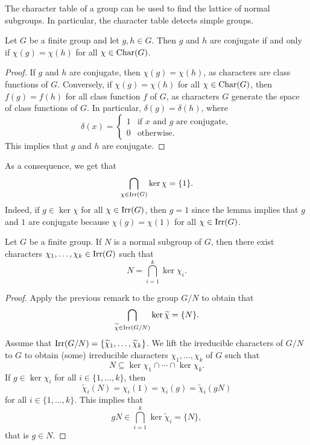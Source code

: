 The character table of a group can be used to find the lattice 
of normal subgroups. In particular, the character table detects simple groups. 

\begin{lemma}
    Let $G$ be a finite group and 
    let $g,h\in G$. Then $g$ and $h$ 
    are conjugate if and only if 
    $\chi(g)=\chi(h)$ for all
    $\chi\in\operatorname{Char}(G)$. 
\end{lemma}

\begin{proof}
    If $g$ and $h$ are conjugate, then $\chi(g)=\chi(h)$, as characters are class functions
    of $G$.
    Conversely, if $\chi(g)=\chi(h)$ for all $\chi\in\operatorname{Char}(G)$, then 
    $f(g)=f(h)$ for all class function $f$ of $G$, 
    as characters $G$ generate the space of class functions of $G$. In particular, 
    $\delta(g)=\delta(h)$, where
    \[
    \delta(x)=\begin{cases}
    1 & \text{if $x$ and $g$ are conjugate},\\
    0 & \text{otherwise}.
    \end{cases}
    \]
    This implies that $g$ and $h$ are conjugate.
\end{proof}

As a consequence, we get that 
\begin{equation}
\label{eq:kernels}
\bigcap_{\chi\in\operatorname{Irr}(G)}\ker\chi=\{1\}.
\end{equation}
Indeed, if $g\in\ker\chi$ for all $\chi\in\operatorname{Irr}(G)$, then $g=1$ since 
the lemma implies that $g$ and $1$ are conjugate
because 
$\chi(g)=\chi(1)$ for all $\chi\in\operatorname{Irr}(G)$.

\begin{proposition}
\label{pro:normal}
    Let $G$ be a finite group. 
    If $N$ is a normal subgroup of $G$, 
    then there exist characters
    $\chi_1,\dots,\chi_k\in\operatorname{Irr}(G)$ 
    such that
    \[
    N=\bigcap_{i=1}^k\ker\chi_i.
    \]
\end{proposition}

\begin{proof}
    Apply the previous remark to the group $G/N$ to obtain that 
    \[
    \bigcap_{\widetilde{\chi}\in\operatorname{Irr}(G/N)}\ker\widetilde{\chi}=\{N\}.
    \]
    Assume that $\operatorname{Irr}(G/N)=\{\widetilde{\chi}_1,\dots,\widetilde{\chi}_k\}$. 
    We lift the irreducible characters of $G/N$ to $G$ 
    to obtain (some) irreducible characters $\chi_1,\dots,\chi_k$ 
    of $G$ such that 
    \[
    N\subseteq\ker\chi_1\cap\cdots\cap\ker\chi_k.
    \]
    If $g\in\ker\chi_i$ for all $i\in\{1,\dots,k\}$, then 
    \[
    \widetilde{\chi}_i(N)=\chi_i(1)=\chi_i(g)=\widetilde{\chi}_i(gN)
    \]
    for all $i\in\{1,\dots,k\}$. This implies that
    \[
    gN\in\bigcap_{i=1}^k\ker\widetilde{\chi}_i=\{N\},
    \]
    that is $g\in N$. 
\end{proof}

